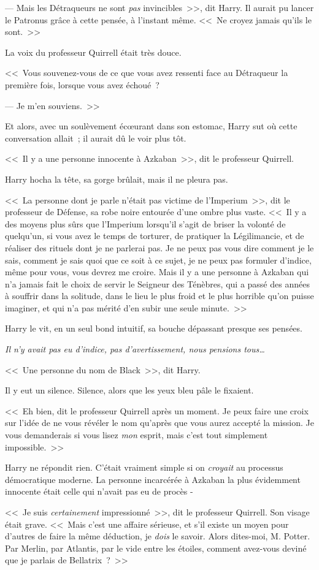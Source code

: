 --- Mais les Détraqueurs ne sont \emph{pas} invincibles~>>, dit Harry. Il aurait pu lancer le Patronus grâce à cette pensée, à l'instant même. <<~Ne croyez jamais qu'ils le sont.~>>

La voix du professeur Quirrell était très douce.

<<~Vous souvenez-vous de ce que vous avez ressenti face au Détraqueur la première fois, lorsque vous avez échoué~?

--- Je m'en souviens.~>>

Et alors, avec un soulèvement écœurant dans son estomac, Harry sut où cette conversation allait~; il aurait dû le voir plus tôt.

<<~Il y a une personne innocente à Azkaban~>>, dit le professeur Quirrell.

Harry hocha la tête, sa gorge brûlait, mais il ne pleura pas.

<<~La personne dont je parle n'était pas victime de l'Imperium~>>, dit le professeur de Défense, sa robe noire entourée d'une ombre plus vaste. <<~Il y a des moyens plus sûrs que l'Imperium lorsqu'il s'agit de briser la volonté de quelqu'un, si vous avez le temps de torturer, de pratiquer la Légilimancie, et de réaliser des rituels dont je ne parlerai pas. Je ne peux pas vous dire comment je le sais, comment je sais quoi que ce soit à ce sujet, je ne peux pas formuler d'indice, même pour vous, vous devrez me croire. Mais il y a une personne à Azkaban qui n'a jamais fait le choix de servir le Seigneur des Ténèbres, qui a passé des années à souffrir dans la solitude, dans le lieu le plus froid et le plus horrible qu'on puisse imaginer, et qui n'a pas mérité d'en subir une seule minute.~>>

Harry le vit, en un seul bond intuitif, sa bouche dépassant presque ses pensées.

\emph{Il n'y avait pas eu d'indice, pas d'avertissement, nous pensions tous…}

<<~Une personne du nom de Black~>>, dit Harry.

Il y eut un silence. Silence, alors que les yeux bleu pâle le fixaient.

<<~Eh bien, dit le professeur Quirrell après un moment. Je peux faire une croix sur l'idée de ne vous révéler le nom qu'après que vous aurez accepté la mission. Je vous demanderais si vous lisez \emph{mon} esprit, mais c'est tout simplement impossible.~>>

Harry ne répondit rien. C'était vraiment simple si on \emph{croyait} au processus démocratique moderne. La personne incarcérée à Azkaban la plus évidemment innocente était celle qui n'avait pas eu de procès -

<<~Je suis \emph{certainement} impressionné~>>, dit le professeur Quirrell. Son visage était grave. <<~Mais c'est une affaire sérieuse, et s'il existe un moyen pour d'autres de faire la même déduction, je \emph{dois} le savoir. Alors dites-moi, M. Potter. Par Merlin, par Atlantis, par le vide entre les étoiles, comment avez-vous deviné que je parlais de Bellatrix~?~>>
